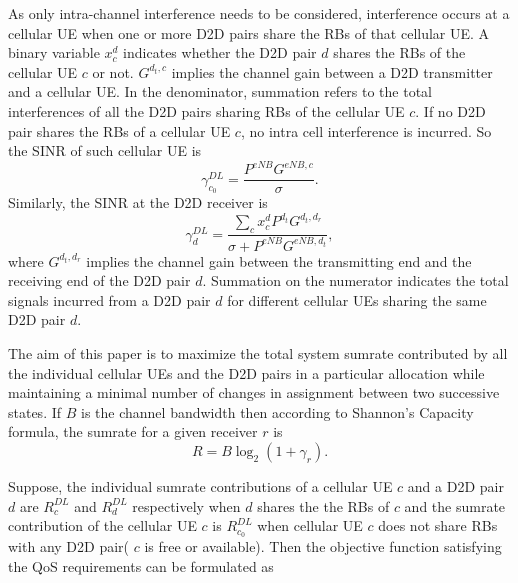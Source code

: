 \documentclass[times]{dacauth}
\begin{document}
\smallskip
\noindent
As only intra-channel interference needs to be considered, interference occurs at a cellular UE when one or more D2D pairs share the RBs of that cellular UE. A binary variable $x_{c}^{d}$ indicates whether the D2D pair $d$  shares the RBs of the cellular UE $c$ or not. $G^{d_{t},c}$ implies the channel gain between a D2D transmitter and a cellular UE. In the denominator, summation refers to the total interferences of all the D2D pairs sharing RBs of the cellular UE $c$. 
If no D2D pair shares the RBs of a cellular UE $c$, no intra cell interference is incurred. So the SINR of such cellular UE is
 \begin{equation}\label{eqn:sinr_c0}
 \gamma_{c_0}^{DL} = \frac{P^{eNB}G^{eNB,c}}{\sigma}.
 \end{equation} Similarly, the SINR at the D2D receiver \cite{zulhasnine} is
\begin{equation}\label{eqn:sinr_d}
 \gamma_{d}^{DL} = \frac{\sum_{c} x_{c}^{d}P^{d_t}G^{d_{t},d_{r}}}{\sigma + P^{ eNB}G^{ eNB,d_{t}}},
\end{equation}
where $G^{d_{t},d_{r}}$ implies the channel gain between the transmitting end and the receiving end of the D2D pair $d$. Summation on the numerator indicates the total signals incurred from a D2D pair $d$ for different cellular UEs sharing the same D2D pair $d$.

\smallskip
\noindent
The aim of this paper is to maximize the total system sumrate contributed by all the individual cellular UEs and the D2D pairs in a particular allocation while maintaining a minimal number of changes in assignment between two successive states. If $B$ is the channel bandwidth then according to Shannon's Capacity formula, the sumrate for a given receiver $r$ is 
\begin{equation}
	R = B\log_{2}(1+\gamma_{ r}). 
\end{equation}


\noindent
Suppose, the individual sumrate contributions of a cellular UE $c$ and a D2D pair $d$ are $R_{c}^{DL}$ and $R_{d}^{DL}$ respectively when $d$ shares the the RBs of $c$ and the sumrate contribution of the cellular UE $c$ is $R_{c_0}^{DL}$ when  cellular UE $c$ does not share RBs with any D2D pair( $c$ is free or available). Then the objective function satisfying the QoS requirements can be formulated as 
\end{document}
